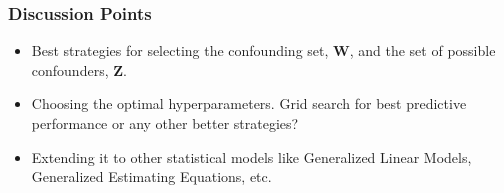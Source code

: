 \documentclass{beamer}
\begin{document}
\begin{frame}
	\frametitle{Discussion Points}
	\begin{itemize}
		\item Best strategies for selecting the confounding set, $
			\bm{W} $, and the set of possible confounders, $ \bm{Z}
			$.
		\item Choosing the optimal hyperparameters. Grid search for best 
			predictive performance or any other better strategies?
		\item Extending it to other statistical models like Generalized
			Linear Models, Generalized Estimating Equations, etc.
	\end{itemize}
\end{frame}
\end{document}
